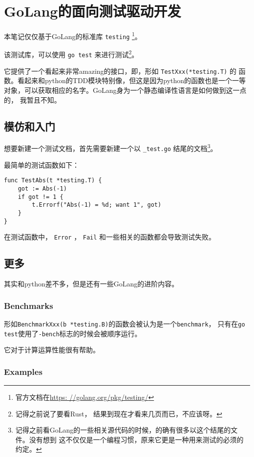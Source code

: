 
\section{GoLang的面向测试驱动开发}

\def\go{GoLang}
\def\ver|#1|{ \verb|#1| }

本笔记仅仅基于\go 的标准库\ver|testing|\footnote{官方文档在\url{https:
//golang.org/pkg/testing/}}。

该测试库，可以使用\ver|go test|来进行测试\footnote{记得之前说了要看Rust，
结果到现在才看来几页而已，不应该呀。}。

它提供了一个看起来非常amazing的接口，即，形如\ver|TestXxx(*testing.T)|的
函数。看起来和python的TDD模块特别像，但这是因为python的函数也是一个一等
对象，可以获取相应的名字。\go 身为一个静态编译性语言是如何做到这一点的，
我暂且不知。

\subsection{模仿和入门}

想要新建一个测试文档，首先需要新建一个以\ver|_test.go|结尾的文档\footnote{%
记得之前看\go 的一些相关源代码的时候，的确有很多以这个结尾的文件。没有想到
这不仅仅是一个编程习惯，原来它更是一种用来测试的必须的约定。}。

最简单的测试函数如下：
\begin{lstlisting}
func TestAbs(t *testing.T) {
    got := Abs(-1)
    if got != 1 {
        t.Errorf("Abs(-1) = %d; want 1", got)
    }
}
\end{lstlisting}

在测试函数中，\ver|Error|，\ver|Fail|和一些相关的函数都会导致测试失败。

\subsection{更多}

其实和python差不多，但是还有一些\go 的进阶内容。

\subsubsection{Benchmarks}

形如\verb|BenchmarkXxx(b *testing.B)|的函数会被认为是一个\verb|benchmark|，
只有在\verb|go test|使用了\verb|-bench|标志的时候会被顺序运行。

它对于计算运算性能很有帮助。

\subsubsection{Examples}

